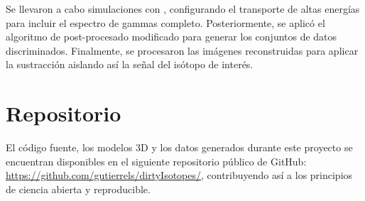 Se llevaron a cabo simulaciones con \penred, configurando el transporte de altas energías para incluir el espectro de gammas completo. Posteriormente, se aplicó el algoritmo de post-procesado modificado para generar los conjuntos de datos discriminados. Finalmente, se procesaron las imágenes reconstruidas para aplicar la sustracción aislando así la señal del isótopo de interés.%


\section{Repositorio}

El código fuente, los modelos 3D y los datos generados durante este proyecto se encuentran disponibles en el siguiente repositorio público de GitHub: \url{https://github.com/gutierrels/dirtyIsotopes/}, contribuyendo así a los principios de ciencia abierta y reproducible.




